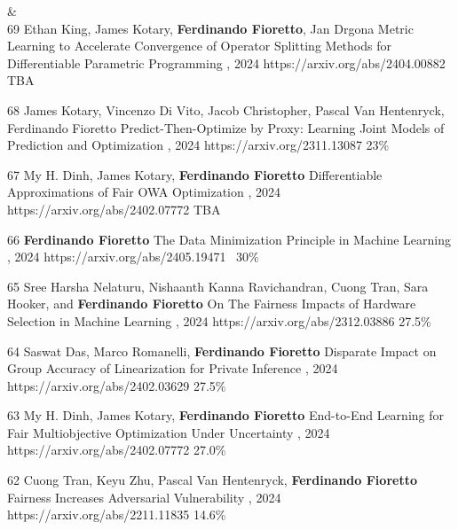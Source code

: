 \begin{pubs}

{}&\nemph{\rule{0.5\linewidth}{0.5pt}}\\[1em]

\confentry
	{69}
	{Ethan King, \student{} James Kotary, {\bf Ferdinando Fioretto}, Jan Drgona}
	{Metric Learning to Accelerate Convergence of Operator Splitting Methods for Differentiable Parametric Programming}
	{, 2024}
	{https://arxiv.org/abs/2404.00882}
	{TBA}

\confentry
	{68}
	{\student{} James Kotary, \student{} Vincenzo Di Vito, \student{} Jacob Christopher, Pascal Van Hentenryck, Ferdinando Fioretto}
	{Predict-Then-Optimize by Proxy: Learning Joint Models of Prediction and Optimization}
  	{\procECAI, 2024}
  	{https://arxiv.org/2311.13087}
  	{23\%} %

\confentry
	{67}
	{\student{}My H. Dinh, \student{} James Kotary, {\bf Ferdinando Fioretto}}
	{Differentiable Approximations of Fair OWA Optimization}
	{, 2024}
	{https://arxiv.org/abs/2402.07772}
	{TBA}

\confentry
	{66}
	{{\bf Ferdinando Fioretto}}
	{The Data Minimization Principle in Machine Learning}
	{, 2024}
	{https://arxiv.org/abs/2405.19471}
	{~30\%}

\confentry
	{65}
	{\student{} Sree Harsha Nelaturu, \student{} Nishaanth Kanna Ravichandran, \student{} Cuong Tran, Sara Hooker, and {\bf Ferdinando Fioretto}}
	{On The Fairness Impacts of Hardware Selection in Machine Learning}	
	{\procICML, 2024}
	{https://arxiv.org/abs/2312.03886}
	{27.5\%}

\confentry
	{64}
	{\student{} Saswat Das, Marco Romanelli, {\bf Ferdinando Fioretto}}
	{Disparate Impact on Group Accuracy of Linearization for Private Inference}
	{\procICML, 2024}
	{https://arxiv.org/abs/2402.03629}
	{27.5\%}

\confentry
	{63}
	{\student{}My H. Dinh, \student{} James Kotary, {\bf Ferdinando Fioretto}}
	{End-to-End Learning for Fair Multiobjective Optimization Under Uncertainty}
	{\procUAI, 2024}
	{https://arxiv.org/abs/2402.07772}
	{27.0\%}

\confentry
	{62}%
	{\student{}Cuong Tran, Keyu Zhu, Pascal Van Hentenryck, {\bf Ferdinando Fioretto}}
	{Fairness Increases Adversarial Vulnerability}
	{\procIJCAI, 2024}
	{https://arxiv.org/abs/2211.11835}
	{14.6\%}


\end{pubs}
